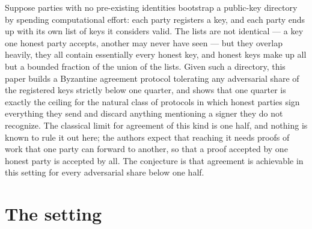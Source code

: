 \documentclass{conjura-conjecture}
\begin{document}

\vspace{0.4em}

\begin{informalconjecture}
Suppose parties with no pre-existing identities bootstrap a public-key
directory by spending computational effort: each party registers a key,
and each party ends up with its own list of keys it considers valid. The
lists are not identical --- a key one honest party accepts, another may
never have seen --- but they overlap heavily, they all contain
essentially every honest key, and honest keys make up all but a bounded
fraction of the union of the lists. Given such a directory, this paper
builds a Byzantine agreement protocol tolerating any adversarial share
of the registered keys strictly below one quarter, and shows that one
quarter is exactly the ceiling for the natural class of protocols in
which honest parties sign everything they send and discard anything
mentioning a signer they do not recognize. The classical limit for
agreement of this kind is one half, and nothing is known to rule it out
here; the authors expect that reaching it needs proofs of work that one
party can forward to another, so that a proof accepted by one honest
party is accepted by all. The conjecture is that agreement is achievable
in this setting for every adversarial share below one half.
\end{informalconjecture}

\section{The setting}\label{sec:setting}
\end{document}

